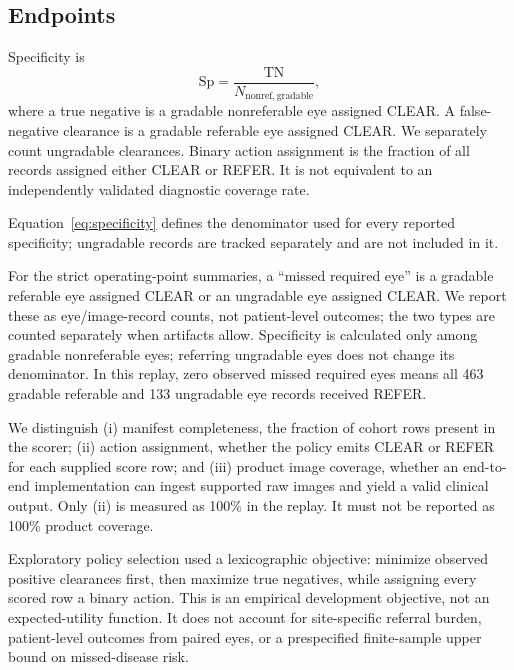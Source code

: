 \documentclass{ieeeaccess}
\begin{document}
\subsection{Endpoints}
Specificity is
\begin{equation}
\mathrm{Sp}=\frac{\mathrm{TN}}{N_{\mathrm{nonref,gradable}}},
\label{eq:specificity}
\end{equation}
where a true negative is a gradable nonreferable eye assigned CLEAR. A false-negative clearance is a gradable referable eye assigned CLEAR. We separately count ungradable clearances. Binary action assignment is the fraction of all records assigned either CLEAR or REFER. It is not equivalent to an independently validated diagnostic coverage rate.

Equation~\eqref{eq:specificity} defines the denominator used for every reported specificity; ungradable records are tracked separately and are not included in it.

For the strict operating-point summaries, a ``missed required eye'' is a gradable referable eye assigned CLEAR or an ungradable eye assigned CLEAR. We report these as eye/image-record counts, not patient-level outcomes; the two types are counted separately when artifacts allow. Specificity is calculated only among gradable nonreferable eyes; referring ungradable eyes does not change its denominator. In this replay, zero observed missed required eyes means all 463 gradable referable and 133 ungradable eye records received REFER.

We distinguish (i) manifest completeness, the fraction of cohort rows present in the scorer; (ii) action assignment, whether the policy emits CLEAR or REFER for each supplied score row; and (iii) product image coverage, whether an end-to-end implementation can ingest supported raw images and yield a valid clinical output. Only (ii) is measured as 100\% in the replay. It must not be reported as 100\% product coverage.

Exploratory policy selection used a lexicographic objective: minimize observed positive clearances first, then maximize true negatives, while assigning every scored row a binary action. This is an empirical development objective, not an expected-utility function. It does not account for site-specific referral burden, patient-level outcomes from paired eyes, or a prespecified finite-sample upper bound on missed-disease risk.
\end{document}
